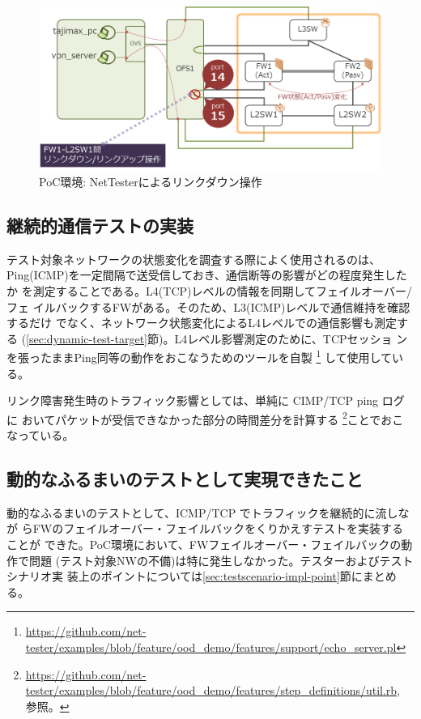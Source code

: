 \begin{figure}[h]
 \centering
 \includegraphics[scale=0.6]{img/poc-env-linkdown.png}
 \caption{PoC環境: NetTesterによるリンクダウン操作}
 \label{fig:poc-env-linkdown}
\end{figure}

  \subsection{継続的通信テストの実装}

テスト対象ネットワークの状態変化を調査する際によく使用されるのは、
Ping(ICMP)を一定間隔で送受信しておき、通信断等の影響がどの程度発生したか
を測定することである。L4(TCP)レベルの情報を同期してフェイルオーバー/フェ
イルバックするFWがある。そのため、L3(ICMP)レベルで通信維持を確認するだけ
でなく、ネットワーク状態変化によるL4レベルでの通信影響も測定する
(\ref{sec:dynamic-test-target}節)。L4レベル影響測定のために、TCPセッショ
ンを張ったままPing同等の動作をおこなうためのツールを自製
\footnote{\url{https://github.com/net-tester/examples/blob/feature/ood_demo/features/support/echo_server.pl}}
して使用している。

リンク障害発生時のトラフィック影響としては、単純に CIMP/TCP ping ログに
おいてパケットが受信できなかった部分の時間差分を計算する
\footnote{\url{https://github.com/net-tester/examples/blob/feature/ood_demo/features/step_definitions/util.rb},
参照。}ことでおこなっている。

  \subsection{動的なふるまいのテストとして実現できたこと}
  \label{sec:dynamic-test-result}

動的なふるまいのテストとして、ICMP/TCP でトラフィックを継続的に流しなが
らFWのフェイルオーバー・フェイルバックをくりかえすテストを実装することが
できた。PoC環境において、FWフェイルオーバー・フェイルバックの動作で問題
(テスト対象NWの不備)は特に発生しなかった。テスターおよびテストシナリオ実
装上のポイントについては\ref{sec:testscenario-impl-point}節にまとめる。

